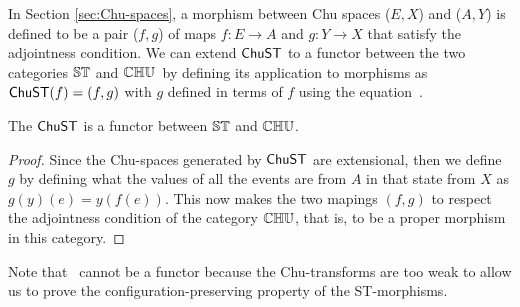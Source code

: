     In Section \ref{sec:Chu-spaces}, a morphism between Chu spaces ($E, X$) and ($A, Y$) is defined to be a pair ($f, g$) of maps $f : E \to A$ and $g: Y \to X$ that satisfy the adjointness condition. We can extend $\mathsf{ChuST}$ to a functor between the two categories $\mathbb{ST}$ and $\mathbb{CHU}$\ by defining its application to morphisms as $\mathsf{ChuST}(f)=(f,g)$ with $g$ defined in terms of $f$ using the equation~.

    \begin{lemma}
        The $\mathsf{ChuST}$ is a functor between $\mathbb{ST}$ and $\mathbb{CHU}$.
    \end{lemma}

    \begin{proof}
        Since the Chu-spaces generated by $\mathsf{ChuST}$ are extensional, then we define $g$ by defining what the values of all the events are from $A$ in that state from $X$ as $g(y)(e)=y(f(e))$. This now makes the two mapings $(f,g)$ to respect the adjointness condition of the category $\mathbb{CHU}$, that is, to be a proper morphism in this category.
    \end{proof}

    Note that \chuintost\ cannot be a functor because the Chu-transforms are too weak
    to allow us to prove the configuration-preserving property of the ST-morphisms.